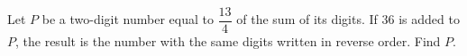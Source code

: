 Let $P$ be a two-digit number equal to $\dfrac{13}{4}$ of the sum of its digits. If $36$ is added to $P$, the result is the number with the same digits written in reverse order. Find $P$.
